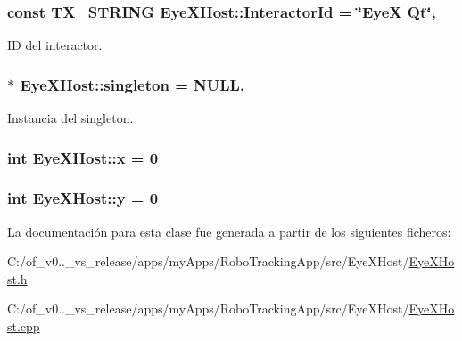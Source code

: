 \subsubsection[{Interactor\+Id}]{\setlength{\rightskip}{0pt plus 5cm}const T\+X\+\_\+\+S\+T\+R\+I\+N\+G Eye\+X\+Host\+::\+Interactor\+Id = \char`\"{}Eye\+X Qt\char`\"{}\hspace{0.3cm}{\ttfamily [static]}, {\ttfamily [private]}}\label{class_eye_x_host_ad5318e87583fd9f98c8831a6f40b0a85}


I\+D del interactor. 

\hypertarget{class_eye_x_host_ab27a57316b24225ee35e50ebd752e962}{}
\subsubsection[{singleton}]{ $\ast$ Eye\+X\+Host\+::singleton = N\+U\+L\+L\hspace{0.3cm}{\ttfamily [static]}, {\ttfamily [private]}}\label{class_eye_x_host_ab27a57316b24225ee35e50ebd752e962}


Instancia del singleton. 

\hypertarget{class_eye_x_host_ab62be3731b1e28ebd84a983e6683ab34}{}
\subsubsection[{x}]{\setlength{\rightskip}{0pt plus 5cm}int Eye\+X\+Host\+::x = 0\hspace{0.3cm}{\ttfamily [static]}}\label{class_eye_x_host_ab62be3731b1e28ebd84a983e6683ab34}
\hypertarget{class_eye_x_host_a35ab6bf6585bd665c4b5c50f8b577a12}{}
\subsubsection[{y}]{\setlength{\rightskip}{0pt plus 5cm}int Eye\+X\+Host\+::y = 0\hspace{0.3cm}{\ttfamily [static]}}\label{class_eye_x_host_a35ab6bf6585bd665c4b5c50f8b577a12}


La documentación para esta clase fue generada a partir de los siguientes ficheros\+:\begin{DoxyCompactItemize}
\item 
C\+:/of\+\_\+v0..\+\_\+vs\+\_\+release/apps/my\+Apps/\+Robo\+Tracking\+App/src/\+Eye\+X\+Host/\hyperlink{_eye_x_host_8h}{Eye\+X\+Host.\+h}\item 
C\+:/of\+\_\+v0..\+\_\+vs\+\_\+release/apps/my\+Apps/\+Robo\+Tracking\+App/src/\+Eye\+X\+Host/\hyperlink{_eye_x_host_8cpp}{Eye\+X\+Host.\+cpp}\end{DoxyCompactItemize}
